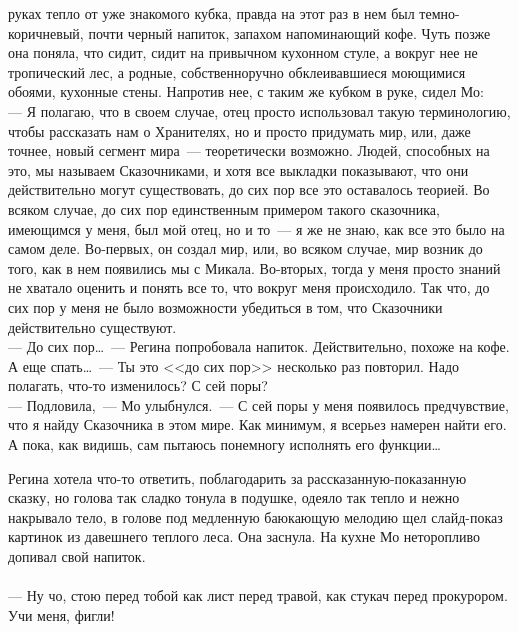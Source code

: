 руках тепло от уже знакомого кубка, правда на этот раз в нем был темно-коричневый, 
почти черный напиток, запахом напоминающий кофе. Чуть позже она поняла, что 
сидит, сидит на привычном кухонном стуле, а вокруг нее не тропический лес, а 
родные, собственноручно обклеивавшиеся моющимися обоями, кухонные стены. 
Напротив нее, с таким же кубком в руке, сидел Мо:\\
--- Я полагаю, что в своем случае, отец просто использовал такую терминологию, 
чтобы рассказать нам о Хранителях, но и просто придумать мир, или, даже точнее, 
новый сегмент мира~--- теоретически возможно. Людей, способных на это, мы 
называем Сказочниками, и хотя все выкладки показывают, что они действительно могут 
существовать, до сих пор все это оставалось теорией. Во всяком случае, до сих 
пор единственным примером такого сказочника, имеющимся у меня, был мой отец, но 
и то~--- я же не знаю, как все это было на самом деле. Во-первых, он создал 
мир, или, во всяком случае, мир возник до того, как в нем появились мы с Микала. 
Во-вторых, тогда у меня просто знаний не хватало оценить и понять все то, что 
вокруг меня происходило. Так что, до сих пор у меня не было возможности 
убедиться в том, что Сказочники действительно существуют.\\
--- До сих пор\ldots~--- Регина попробовала напиток. Действительно, похоже на 
кофе. А еще спать\ldots~--- Ты это <<до сих пор>> несколько раз повторил. Надо 
полагать, что-то изменилось? С сей поры?\\
--- Подловила,~--- Мо улыбнулся.~--- С сей поры у меня появилось предчувствие, 
что я найду Сказочника в этом мире. Как минимум, я всерьез намерен найти его. А пока, 
как видишь, сам пытаюсь понемногу исполнять его функции\ldots

Регина хотела что-то ответить, поблагодарить за рассказанную-показанную сказку, 
но голова так сладко тонула в подушке, одеяло так тепло и нежно накрывало тело, 
в голове под медленную баюкающую мелодию щел слайд-показ картинок из давешнего 
теплого леса. Она заснула. На кухне Мо неторопливо допивал свой напиток.\\
\\

\noindent --- Ну чо, стою перед тобой как лист перед травой, как стукач перед прокурором. 
Учи меня, фигли!

